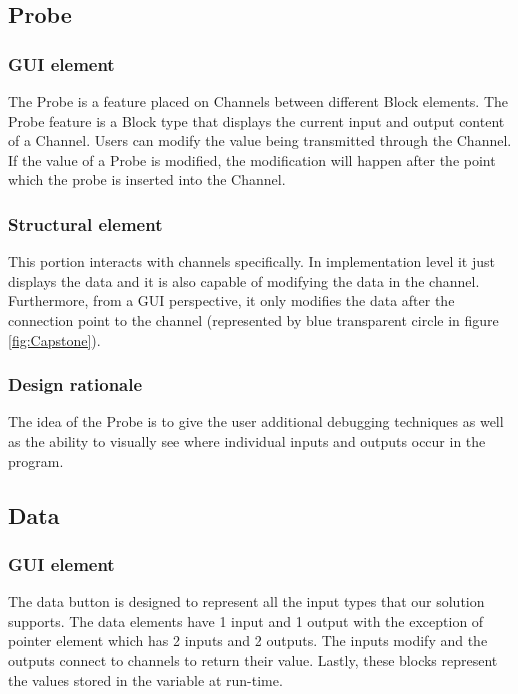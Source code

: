 \documentclass[journal,10pt,onecolumn,compsoc]{IEEEtran} \usepackage[margin=1.0in]{geometry} \usepackage{pdfpages}
\begin{document}
\subsection{Probe}
\subsubsection{GUI element}
\noindent The Probe is a feature placed on Channels between different Block elements. The Probe feature is a Block type that displays the current input and output content of a Channel. Users can modify the value being transmitted through the Channel. If the value of a Probe is modified, the modification will happen after the point which the probe is inserted into the Channel.
\subsubsection{Structural element}
\noindent This portion interacts with channels specifically. In implementation level it just displays the data and it is also capable of modifying the data in the channel. Furthermore, from a GUI perspective, it only modifies the data after the connection point to the channel (represented by blue transparent circle in figure \ref{fig:Capstone}).
\subsubsection{Design rationale}
\noindent The idea of the Probe is to give the user additional debugging techniques as well as the ability to visually see where individual inputs and  outputs occur in the program.
\subsection{Data}\label{Data}
\subsubsection{GUI element}
\noindent The data button is designed to represent all the input types that our solution supports. The data elements have 1 input and 1 output with the exception of pointer element which has 2 inputs and 2 outputs. The inputs modify and the outputs connect to channels to return their value.
Lastly, these blocks represent the values stored in the variable at run-time.
\end{document}
